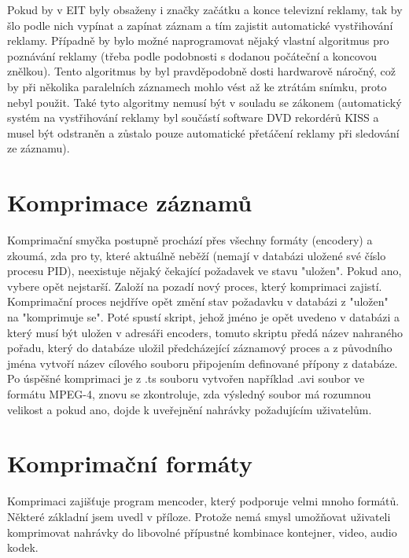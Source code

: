 \vspace{10pt}

Pokud by v EIT byly obsaženy i značky začátku a konce televizní reklamy, tak by šlo podle nich vypínat a zapínat záznam a tím zajistit automatické vystřihování reklamy. Případně by bylo možné naprogramovat nějaký vlastní algoritmus pro poznávání reklamy (třeba podle podobnosti s dodanou počáteční a koncovou znělkou). Tento algoritmus by byl pravděpodobně dosti hardwarově náročný, což by při několika paralelních záznamech mohlo vést až ke ztrátám snímku, proto nebyl použit. Také tyto algoritmy nemusí být v souladu se zákonem (automatický systém na vystřihování reklamy byl součástí software DVD rekordérů KISS a musel být odstraněn a zůstalo pouze automatické přetáčení reklamy při sledování ze záznamu).

\section{Komprimace záznamů}

Komprimační smyčka postupně prochází přes všechny formáty (encodery) a zkoumá, zda pro ty, které aktuálně neběží (nemají v databázi uložené své číslo procesu PID), neexistuje nějaký čekající požadavek ve stavu "uložen". Pokud ano, vybere opět nejstarší. Založí na pozadí nový proces, který komprimaci zajistí. Komprimační proces nejdříve opět změní stav požadavku v databázi z "uložen" na "komprimuje se". 
Poté spustí skript, jehož jméno je opět uvedeno v databázi a který musí být uložen v adresáři encoders, tomuto skriptu předá název nahraného pořadu, který do databáze uložil předcházející záznamový proces a z původního jména vytvoří název cílového souboru připojením definované přípony z databáze. Po úspěšné komprimaci je z .ts souboru vytvořen například .avi soubor ve formátu MPEG-4, znovu se zkontroluje, zda výsledný soubor má rozumnou velikost a pokud ano, dojde k uveřejnění nahrávky požadujícím uživatelům. 

\vspace{10pt}

\section{Komprimační formáty}

Komprimaci zajišťuje program mencoder, který podporuje velmi mnoho formátů. Některé základní jsem uvedl v příloze.
Protože nemá smysl umožňovat uživateli komprimovat nahrávky do libovolné přípustné kombinace kontejner, video, audio kodek. 

